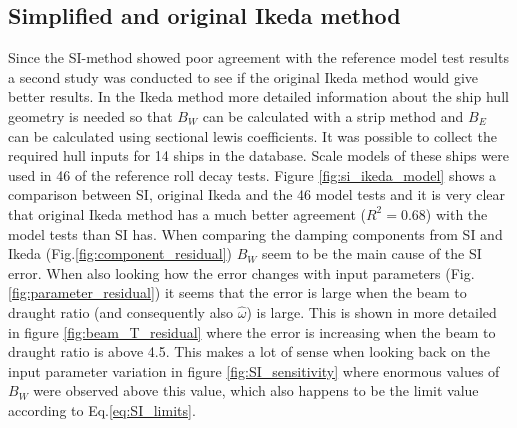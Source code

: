 \subsection{Simplified and original Ikeda method}
\label{se:si_ikeda_model}
Since the SI-method showed poor agreement with the reference model test results a second study was conducted to see if the original Ikeda method would give better results. In the Ikeda method more detailed information about the ship hull geometry is needed so that $B_W$ can be calculated with a strip method and $B_E$ can be calculated using sectional lewis coefficients. It was possible to collect the required hull inputs for 14 ships in the database. Scale models of these ships were used in 46 of the reference roll decay tests.
Figure \ref{fig:si_ikeda_model} shows a comparison between SI, original Ikeda and the 46 model tests and it is very clear that original Ikeda method has a much better agreement ($R^2=0.68$) with the model tests than SI has. When comparing the damping components from SI and Ikeda (Fig.\ref{fig:component_residual}) $B_W$ seem to be the main cause of the SI error. When also looking how the error changes with input parameters (Fig.\ref{fig:parameter_residual}) it seems that the error is large when the beam to draught ratio (and consequently also $\hat{\omega}$) is large. This is shown in more detailed in figure \ref{fig:beam_T_residual} where the error is increasing when the beam to draught ratio is above 4.5. This makes a lot of sense when looking back on the input parameter variation in figure \ref{fig:SI_sensitivity} where enormous values of $B_W$ were observed above this value, which also happens to be the limit value according to Eq.\ref{eq:SI_limits}.

